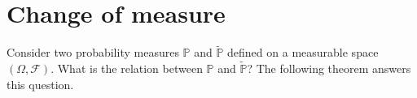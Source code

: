 \documentclass[12pt]{book}
\numberwithin{equation}{chapter}
\theoremstyle{plain}
\numberwithin{theorem}{section}
\theoremstyle{definition}
\newtheorem{definition}[theorem]{\underline{Definition}}
\numberwithin{exercise}{chapter}
\newcommand{\<}{\langle}
\renewcommand{\>}{\rangle}
\renewcommand{\(}{\left(}
\renewcommand{\)}{\right)}
\renewcommand{\[}{\left[}
\renewcommand{\]}{\right]}
\newcommand\Eb{\mathds{E}}
\newcommand\Ib{\mathds{1}} 	%
\newcommand\Pb{\mathds{P}}
\newcommand\Fc{\mathscr{F}}
\newcommand\om{\omega}
\newcommand\Om{\Omega}
\newcommand\Pbt{\widetilde{\Pb}}
\newcommand\dd{\mathrm{d}}
\begin{document}



\section{Change of measure}
\label{sec:measure.change}
Consider two probability measures $\Pb$ and $\Pbt$ defined on a measurable space $(\Om,\Fc)$.  What is the relation between $\Pb$ and $\Pbt$?  The following theorem answers this question.
\end{document}
